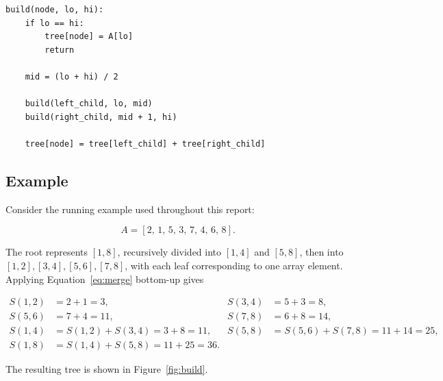 \documentclass[11pt,open=any]{scrreprt}
\begin{document}
\begin{lstlisting}
build(node, lo, hi):
    if lo == hi:
        tree[node] = A[lo]
        return

    mid = (lo + hi) / 2

    build(left_child, lo, mid)
    build(right_child, mid + 1, hi)

    tree[node] = tree[left_child] + tree[right_child]
\end{lstlisting}

\subsection{Example}
Consider the running example used throughout this report:

\begin{equation}
A = [2,\,1,\,5,\,3,\,7,\,4,\,6,\,8].
\end{equation}

The root represents $[1,8]$, recursively divided into $[1,4]$ and $[5,8]$, then into $[1,2],[3,4],[5,6],[7,8]$, with each leaf corresponding to one array element. Applying Equation~\eqref{eq:merge} bottom-up gives

\begin{align}
S(1,2) &= 2+1 = 3, & S(3,4) &= 5+3 = 8, \\
S(5,6) &= 7+4 = 11, & S(7,8) &= 6+8 = 14, \\
S(1,4) &= S(1,2)+S(3,4) = 3+8 = 11, & S(5,8) &= S(5,6)+S(7,8) = 11+14 = 25, \\
S(1,8) &= S(1,4)+S(5,8) = 11+25 = 36. &&
\end{align}

The resulting tree is shown in Figure~\ref{fig:build}.
\end{document}
